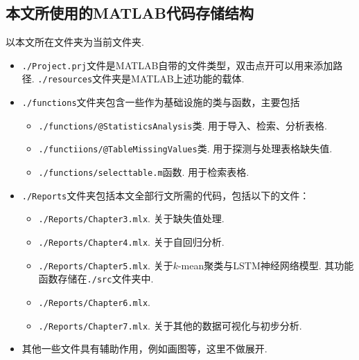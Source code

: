 \documentclass[a4paper, titlepage]{article}
\begin{document}
\begin{enumerate}
    \newpage
    \section{本文所使用的MATLAB代码存储结构}\label{存储结构}
    以本文所在文件夹为当前文件夹. 
    \begin{itemize}
        \item \texttt{./Project.prj}文件是MATLAB自带的文件类型，双击点开可以用来添加路径. \texttt{./resources}文件夹是MATLAB上述功能的载体.
        \item \texttt{./functions}文件夹包含一些作为基础设施的类与函数，主要包括
            \begin{itemize}
                \item \texttt{./functions/@StatisticsAnalysis}类. 用于导入、检索、分析表格.
                \item \texttt{./functiions/@TableMissingValues}类. 用于探测与处理表格缺失值.
                \item \texttt{./functions/selecttable.m}函数. 用于检索表格.
            \end{itemize}
        \item \texttt{./Reports}文件夹包括本文全部行文所需的代码，包括以下的文件：
            \begin{itemize}
                \item \texttt{./Reports/Chapter3.mlx}. 关于缺失值处理.
                \item \texttt{./Reports/Chapter4.mlx}. 关于自回归分析.
                \item \texttt{./Reports/Chapter5.mlx}. 关于$k$-mean聚类与LSTM神经网络模型. 其功能函数存储在\texttt{./src}文件夹中.
                \item \texttt{./Reports/Chapter6.mlx}.
                \item \texttt{./Reports/Chapter7.mlx}. 关于其他的数据可视化与初步分析.
            \end{itemize}
        \item 其他一些文件具有辅助作用，例如画图等，这里不做展开.
    \end{itemize}
\end{enumerate}
\end{document}
